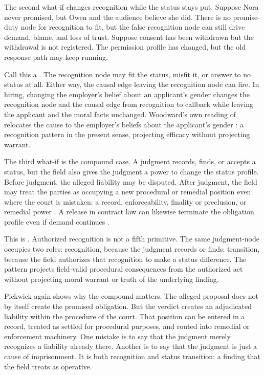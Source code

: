 \documentclass[12pt]{article}
\begin{document}
The second what-if changes recognition while the status stays put. Suppose Nora never promised, but Owen and the audience believe she did. There is no promise-duty node for recognition to fit, but the false recognition node can still drive demand, blame, and loss of trust. Suppose consent has been withdrawn but the withdrawal is not registered. The permission profile has changed, but the old response path may keep running.

Call this a . The recognition node may fit the status, misfit it, or answer to no status at all. Either way, the causal edge leaving the recognition node can fire. In hiring, changing the employer's belief about an applicant's gender changes the recognition node and the causal edge from recognition to callback while leaving the applicant and the moral facts unchanged. Woodward's own reading of  relocates the cause to the employer's beliefs about the applicant's gender \citep{woodward2014MethodologyOntology}: a recognition pattern in the present sense, projecting efficacy without projecting warrant.

The third what-if is the compound case. A judgment records, finds, or accepts a status, but the field also gives the judgment a power to change the status profile. Before judgment, the alleged liability may be disputed. After judgment, the field may treat the parties as occupying a new procedural or remedial position even where the court is mistaken: a record, enforceability, finality or preclusion, or remedial power \citep{americanLawInstitute1982RestatementJudgments}. A release in contract law can likewise terminate the obligation profile even if demand continues \citep{americanLawInstitute1981RestatementContracts}.

This is . Authorized recognition is not a fifth primitive. The same judgment-node occupies two roles: recognition, because the judgment records or finds; transition, because the field authorizes that recognition to make a status difference. The pattern projects field-valid procedural consequences from the authorized act without projecting moral warrant or truth of the underlying finding.

Pickwick again shows why the compound matters. The alleged proposal does not by itself create the promised obligation. But the verdict creates an adjudicated liability within the procedure of the court. That position can be entered in a record, treated as settled for procedural purposes, and routed into remedial or enforcement machinery. One mistake is to say that the judgment merely recognizes a liability already there. Another is to say that the judgment is just a cause of imprisonment. It is both recognition and status transition: a finding that the field treats as operative.
\end{document}
